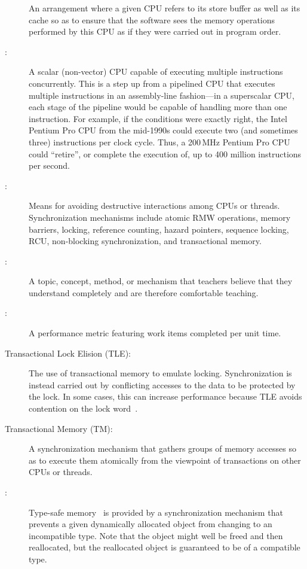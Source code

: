 \begin{description}
	An arrangement where a given CPU refers to its store buffer
	as well as its cache so as to ensure that the software sees
	the memory operations performed by this CPU as if they
	were carried out in program order.
\item[\IXr{Superscalar CPU}:]
	A scalar (non-vector) CPU capable of executing multiple instructions
	concurrently.
	This is a step up from a pipelined CPU that executes multiple
	instructions in an assembly-line fashion---in a superscalar
	CPU, each stage of the pipeline would be capable of handling
	more than one instruction.
	For example, if the conditions were exactly right,
	the Intel Pentium Pro CPU from the mid-1990s could
	execute two (and sometimes three) instructions per clock cycle.
	Thus, a 200\,MHz Pentium Pro CPU could ``retire'', or complete the
	execution of, up to 400 million instructions per second.
\item[\IX{Synchronization}:]
	Means for avoiding destructive interactions among CPUs or threads.
	Synchronization mechanisms include atomic RMW operations, memory
	barriers, locking, reference counting, hazard pointers, sequence
	locking, RCU, non-blocking synchronization, and transactional
	memory.
\item[\IX{Teachable}:]
	A topic, concept, method, or mechanism that teachers believe that
	they understand completely and are therefore comfortable teaching.
\item[\IX{Throughput}:]
	A performance metric featuring work items completed per unit time.
\item[Transactional Lock Elision (TLE):]
	The use of transactional memory to emulate locking.
	Synchronization is instead carried out by conflicting accesses
	to the data to be protected by the lock.
	In some cases, this can increase performance because TLE
	avoids contention on the lock
	word~\cite{MartinPohlack2011HTM2TLE,Kleen:2014:SEL:2566590.2576793,PascalFelber2016rwlockElision,SeongJaePark2020HTMRCUlock}.
\item[Transactional Memory (TM):]
	A synchronization mechanism that gathers groups of memory
	accesses so as to execute them atomically from the viewpoint
	of transactions on other CPUs or threads.
\item[\IX{Type-Safe Memory}:]
	Type-safe memory~\cite{Cheriton96a} is provided by a
	synchronization mechanism that prevents a given dynamically
	allocated object from changing to an incompatible type.
	Note that the object might well be freed and then reallocated, but
	the reallocated object is guaranteed to be of a compatible type.

\end{description}
